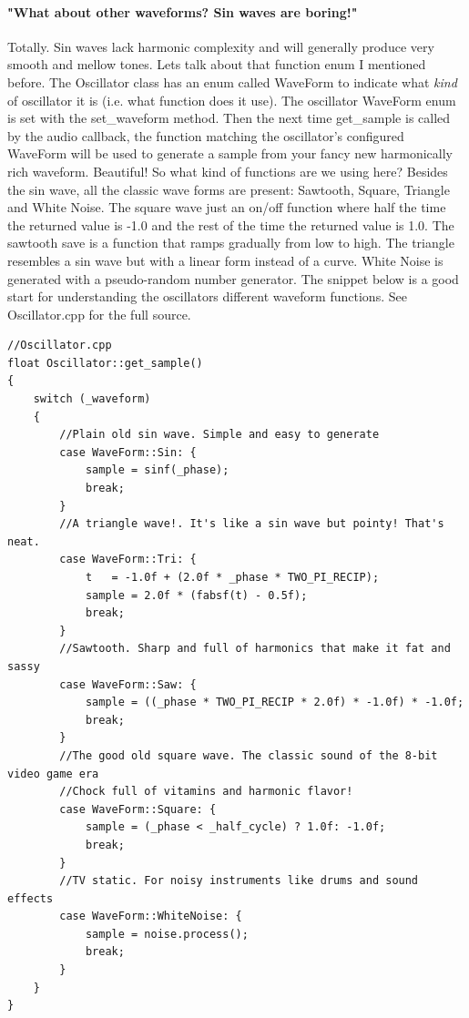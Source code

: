 \documentclass[acmlarge,screen]{acmart}
\begin{document}
	\paragraph{"What about other waveforms? Sin waves are boring!"} Totally. Sin waves lack harmonic complexity and will generally produce very smooth and mellow tones. Lets talk about that function enum I mentioned before. The Oscillator class has an enum called WaveForm to indicate what \textit{kind} of oscillator it is (i.e. what function does it use). The oscillator WaveForm enum is set with the set\_waveform method. Then the next time get\_sample is called by the audio callback, the function matching the oscillator's configured WaveForm will be used to generate a sample from your fancy new harmonically rich waveform. \cite{downey_2016} Beautiful! So what kind of functions are we using here? Besides the sin wave, all the classic wave forms are present: Sawtooth, Square, Triangle and White Noise. The square wave just an on/off function where half the time the returned value is -1.0 and the rest of the time the returned value is 1.0. The sawtooth save is a function that ramps gradually from low to high. The triangle resembles a sin wave but with a linear form instead of a curve. White Noise is generated with a pseudo-random number generator. \cite{tagi_2019} The snippet below is a good start for understanding the oscillators different waveform functions. See Oscillator.cpp for the full source.
	
	
	\begin{verbatim}
//Oscillator.cpp
float Oscillator::get_sample()
{
	switch (_waveform)
	{
		//Plain old sin wave. Simple and easy to generate
		case WaveForm::Sin: {
			sample = sinf(_phase);
			break;
		}
		//A triangle wave!. It's like a sin wave but pointy! That's neat.
		case WaveForm::Tri: {
			t   = -1.0f + (2.0f * _phase * TWO_PI_RECIP);
			sample = 2.0f * (fabsf(t) - 0.5f);
			break;
		}
		//Sawtooth. Sharp and full of harmonics that make it fat and sassy
		case WaveForm::Saw: {
			sample = ((_phase * TWO_PI_RECIP * 2.0f) * -1.0f) * -1.0f;
			break;
		}
		//The good old square wave. The classic sound of the 8-bit video game era
		//Chock full of vitamins and harmonic flavor!
		case WaveForm::Square: {
			sample = (_phase < _half_cycle) ? 1.0f: -1.0f;
			break;
		}
		//TV static. For noisy instruments like drums and sound effects
		case WaveForm::WhiteNoise: {
			sample = noise.process();
			break;
		}
	}
}
	\end{verbatim}
\end{document}
